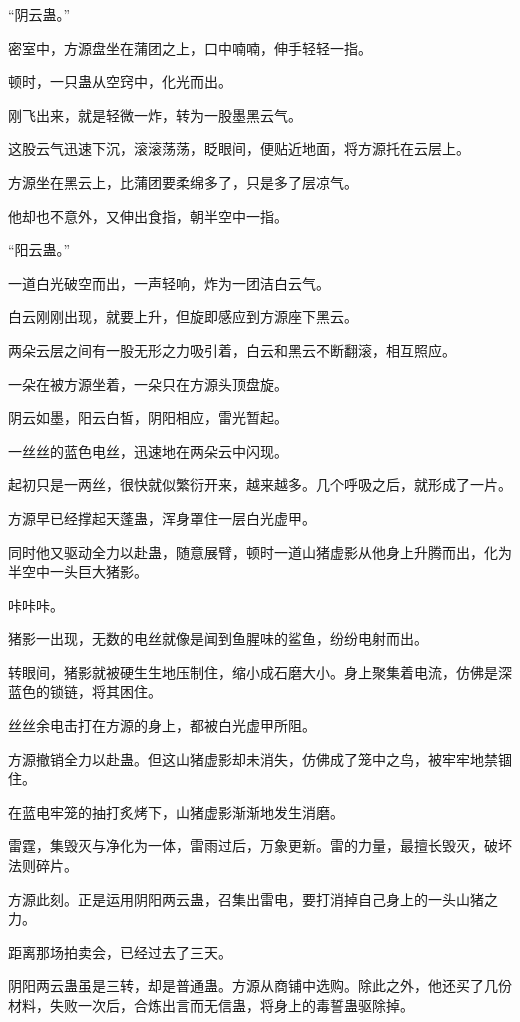 
\begin{this_body}

“阴云蛊。”

密室中，方源盘坐在蒲团之上，口中喃喃，伸手轻轻一指。

顿时，一只蛊从空窍中，化光而出。

刚飞出来，就是轻微一炸，转为一股墨黑云气。

这股云气迅速下沉，滚滚荡荡，眨眼间，便贴近地面，将方源托在云层上。

方源坐在黑云上，比蒲团要柔绵多了，只是多了层凉气。

他却也不意外，又伸出食指，朝半空中一指。

“阳云蛊。”

一道白光破空而出，一声轻响，炸为一团洁白云气。

白云刚刚出现，就要上升，但旋即感应到方源座下黑云。

两朵云层之间有一股无形之力吸引着，白云和黑云不断翻滚，相互照应。

一朵在被方源坐着，一朵只在方源头顶盘旋。

阴云如墨，阳云白皙，阴阳相应，雷光暂起。

一丝丝的蓝色电丝，迅速地在两朵云中闪现。

起初只是一两丝，很快就似繁衍开来，越来越多。几个呼吸之后，就形成了一片。

方源早已经撑起天蓬蛊，浑身罩住一层白光虚甲。

同时他又驱动全力以赴蛊，随意展臂，顿时一道山猪虚影从他身上升腾而出，化为半空中一头巨大猪影。

咔咔咔。

猪影一出现，无数的电丝就像是闻到鱼腥味的鲨鱼，纷纷电射而出。

转眼间，猪影就被硬生生地压制住，缩小成石磨大小。身上聚集着电流，仿佛是深蓝色的锁链，将其困住。

丝丝余电击打在方源的身上，都被白光虚甲所阻。

方源撤销全力以赴蛊。但这山猪虚影却未消失，仿佛成了笼中之鸟，被牢牢地禁锢住。

在蓝电牢笼的抽打炙烤下，山猪虚影渐渐地发生消磨。

雷霆，集毁灭与净化为一体，雷雨过后，万象更新。雷的力量，最擅长毁灭，破坏法则碎片。

方源此刻。正是运用阴阳两云蛊，召集出雷电，要打消掉自己身上的一头山猪之力。

距离那场拍卖会，已经过去了三天。

阴阳两云蛊虽是三转，却是普通蛊。方源从商铺中选购。除此之外，他还买了几份材料，失败一次后，合炼出言而无信蛊，将身上的毒誓蛊驱除掉。


\end{this_body}
